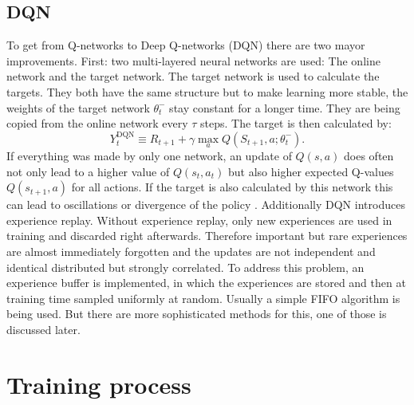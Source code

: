 \documentclass[12pt]{article}
\begin{document}
\subsection{DQN}
To get from Q-networks to Deep Q-networks (DQN) there are two mayor improvements.
First: two multi-layered neural networks are used: The online network and the target network. The target network is used to calculate the targets. They both have the same structure but to make learning more stable, the weights of the target network $\theta_t^-$ stay constant for a longer time. 
They are being copied from the online network every $\tau$ steps.
The target is then calculated by:
\begin{equation}
Y_{t}^{\mathrm{DQN}} \equiv R_{t+1}+\gamma \max _{a} Q\left(S_{t+1}, a ; \theta_{t}^{-}\right).
\end{equation}
If everything was made by only one network, an update of $Q(s,a)$ does often not only lead to a higher value of $Q(s_t,a_t)$ but also higher expected Q-values $Q(s_{t+1},a)$ for all actions. If the target is also calculated by this network this can lead to oscillations or divergence of the policy \cite{DBLP:journals/corr/MnihKSGAWR13}.
Additionally DQN introduces experience replay. Without experience replay, only new experiences are used in training and discarded right afterwards.
Therefore important but rare experiences are almost immediately forgotten and the updates are not independent and identical distributed but strongly correlated.
To address this problem, an experience buffer is implemented, in which the experiences are stored and then at training time sampled uniformly at random. Usually a simple FIFO algorithm is being used. But there are more sophisticated methods for this, one of those is discussed later.
\section{Training process}
\end{document}
